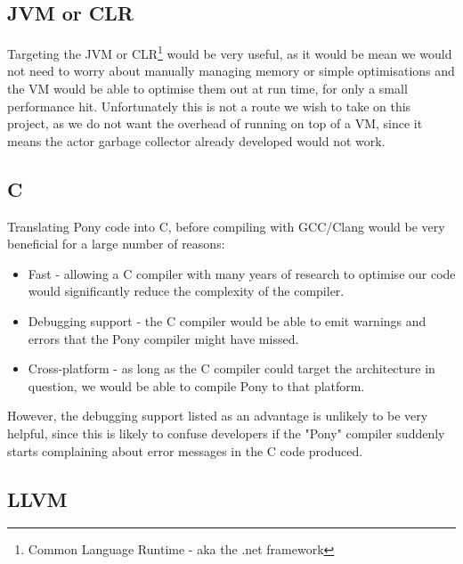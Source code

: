 \documentclass[pdftex,12pt,a4paper]{article}
\begin{document}
\subsection{JVM or CLR}

Targeting the JVM or CLR\footnote{Common Language Runtime - aka the .net framework} would be very useful, as it would be mean we would not need to worry about manually managing memory or simple optimisations and the VM would be able to optimise them out at run time, for only a small performance hit.
Unfortunately this is not a route we wish to take on this project, as we do not want the overhead of running on top of a VM, since it means the actor garbage collector already developed would not work.

\subsection{C}

Translating Pony code into C, before compiling with GCC/Clang would be very beneficial for a large number of reasons:
\begin{itemize}[noitemsep]
\item Fast - allowing a C compiler with many years of research to optimise our code would significantly reduce the complexity of the compiler.
\item Debugging support - the C compiler would be able to emit warnings and errors that the Pony compiler might have missed.
\item Cross-platform - as long as the C compiler could target the architecture in question, we would be able to compile Pony to that platform.
\end{itemize}

However, the debugging support listed as an advantage is unlikely to be very helpful, since this is likely to confuse developers if the "Pony" compiler suddenly starts complaining about error messages in the C code produced.

\subsection{LLVM}
\end{document}
